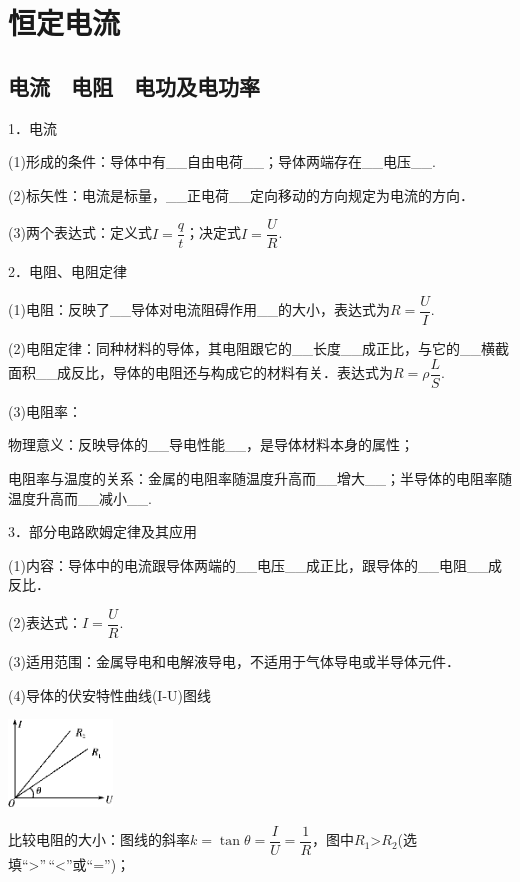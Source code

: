 \chapter{恒定电流}

\section{电流　电阻　电功及电功率}





1．电流

(1)形成的条件：导体中有\_\_自由电荷\_\_；导体两端存在\_\_电压\_\_.

(2)标矢性：电流是标量，\_\_正电荷\_\_定向移动的方向规定为电流的方向．

(3)两个表达式：定义式$I=\dfrac{q}{t}$；决定式$I=\dfrac{U}{R}$.

2．电阻、电阻定律

(1)电阻：反映了\_\_导体对电流阻碍作用\_\_的大小，表达式为$R=\dfrac{U}{I}$.

(2)电阻定律：同种材料的导体，其电阻跟它的\_\_长度\_\_成正比，与它的\_\_横截面积\_\_成反比，导体的电阻还与构成它的材料有关．表达式为$R=\rho \dfrac{L}{S}$.

(3)电阻率：

物理意义：反映导体的\_\_导电性能\_\_，是导体材料本身的属性；

电阻率与温度的关系：金属的电阻率随温度升高而\_\_增大\_\_；半导体的电阻率随温度升高而\_\_减小\_\_.

3．部分电路欧姆定律及其应用

(1)内容：导体中的电流跟导体两端的\_\_电压\_\_成正比，跟导体的\_\_电阻\_\_成反比．

(2)表达式：$I=\dfrac{U}{R}$.

(3)适用范围：金属导电和电解液导电，不适用于气体导电或半导体元件．

(4)导体的伏安特性曲线(I-U)图线

\begin{center}\includegraphics[width=1.09444in,height=0.91528in]{media/image307.png}\end{center}

比较电阻的大小：图线的斜率$k=\tan \theta=\dfrac{I}{U}=\dfrac{1}{R}$，图中$R_1$\textgreater$R_2$(选填``\textgreater''\,``\textless''或``='')；

